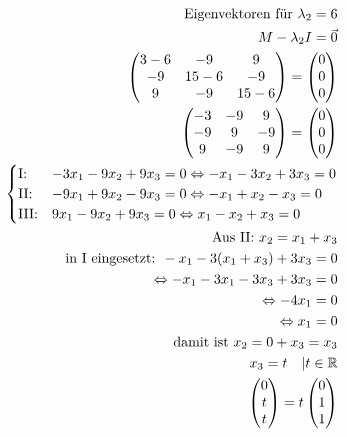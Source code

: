 \begin{align*}
\text{Eigenvektoren für } \lambda_2 = 6 \\
M - \lambda_2 I = \vec{0} \\
\begin{pmatrix}
    3 - 6 & -9 & 9 \\ -9 & 15 - 6 & -9 \\ 9 & -9 & 15 - 6
\end{pmatrix} = \begin{pmatrix} 0 \\ 0 \\ 0 \end{pmatrix} \\
\begin{pmatrix}
    -3 & -9 & 9 \\ -9 & 9 & -9 \\ 9 & -9 & 9
\end{pmatrix} = \begin{pmatrix} 0 \\ 0 \\ 0 \end{pmatrix} \\
\begin{cases}
    \text{I:\@} & -3x_1 - 9x_2 + 9x_3 = 0 \Leftrightarrow -x_1 - 3x_2 + 3x_3 = 0 \\
    \text{II:\@} & -9x_1 + 9x_2 - 9x_3 = 0 \Leftrightarrow -x_1 + x_2 - x_3 = 0 \\
    \text{III:\@} & 9x_1 - 9x_2 + 9x_3 = 0 \Leftrightarrow x_1 - x_2 + x_3 = 0
\end{cases} \\
\text{Aus II: } x_2 = x_1 + x_3 \\
\text{in I eingesetzt: } -x_1 - 3(x_1 + x_3) + 3x_3 = 0 \\
\Leftrightarrow -x_1 - 3x_1 - 3x_3 + 3x_3 = 0 \\
\Leftrightarrow -4x_1 = 0 \\
\Leftrightarrow x_1 = 0 \\
\text{damit ist } x_2 = 0 + x_3 = x_3 \\
x_3 = t \quad | t \in \mathbb{R} \\
\begin{pmatrix} 0 \\ t \\ t \end{pmatrix} = t \begin{pmatrix} 0 \\ 1 \\ 1 \end{pmatrix} \\

\end{align*}
